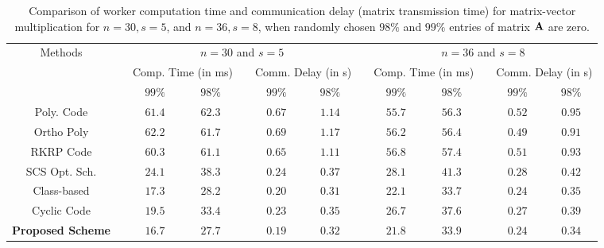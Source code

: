 \begin{table*}[t]
\caption{{\small Comparison of worker computation time and communication delay (matrix transmission time) for matrix-vector multiplication for $n = 30, s = 5$, and $n = 36, s = 8$, when randomly chosen $98\%$ and $99\%$ entries of matrix $\mathbf{A}$ are zero.}}
\vspace{-0.1in}
\label{table:worker_comp}
\begin{center}
\begin{small}
\begin{sc}
\begin{tabular}{c c c c c c c c c c c c c}
\hline
\toprule
\multirow{3}{*}{Methods} & & \multicolumn{5}{c}{$n = 30$ and $s = 5$} & &  \multicolumn{5}{c}{$n = 36$ and $s = 8$} \\ \cline{3-7} \cline{9-13}
 & & \multicolumn{2}{c}{Comp. Time (in ms)} & &  \multicolumn{2}{c}{Comm. Delay (in s)} & & \multicolumn{2}{c}{Comp. Time (in ms)} & & \multicolumn{2}{c}{Comm. Delay (in s)}\\ \cline{3-4} \cline{6-7} \cline{9-10} \cline{12-13}
& & $99\%$ &  $98\%$ & & $99\%$ & $ 98\%$ & & $99\%$ &  $ 98\%$ &  & $ 99\%$ &  $ 98\%$   \\
 \midrule
Poly. Code  \cite{yu2017polynomial} & & $61.4$ & $62.3$ & & $0.67$ & $1.14$ & & $55.7$ &  $56.3$ & & $0.52$ & $0.95$  \\
Ortho Poly  \cite{8849468}   & & $62.2$ & $61.7$ & & $0.69$ & $1.17$ & & $56.2$ &  $56.4$ & & $0.49$ & $0.91$  \\
RKRP Code \cite{8919859} & & $60.3$ & $61.1$ & & $0.65$ & $1.11$ & & $56.8$ &  $57.4$ & & $0.51$ & $0.93$  \\
SCS Opt. Sch. \cite{das2020coded} & & $24.1$ & $38.3$ & & $0.24$ & $0.37$ & & $28.1$ & $41.3$ & & $0.28$ & $0.42$  \\
Class-based \cite{dasunifiedtreatment} & & $17.3$ & $28.2$ & & $0.20$ & $0.31$ & & $22.1$ & $33.7$ & & $0.24$ & $0.35$  \\
Cyclic Code \cite{das2023jsait_submitted} & & $19.5$ & $33.4$ & & $0.23$ & $0.35$ & & $26.7$ &  $37.6$ & & $0.27$ & $0.39$  \\
{\bf Proposed Scheme} & & $\mathbf{16.7}$ & $\mathbf{27.7}$ & & $\mathbf{0.19}$ & $\mathbf{0.32}$ & & $\mathbf{21.8}$ &  $\mathbf{33.9}$ & & $\mathbf{0.24}$ & $\mathbf{0.34}$  \\
\bottomrule
\end{tabular}
\end{sc}
\end{small}
\end{center}
\vspace{-0.15in}
\end{table*}%


